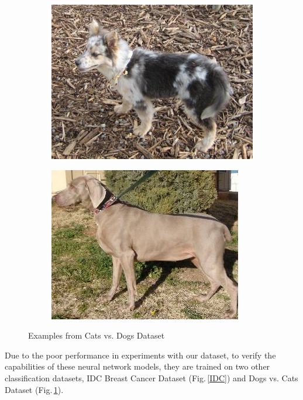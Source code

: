 \begin{figure}[h]
\begin{subfigure}[b]{.2\linewidth}
\end{subfigure}
\begin{subfigure}[b]{.2\linewidth}
\includegraphics[width=\linewidth]{Figs/dog4133.jpg}
\end{subfigure}
\begin{subfigure}[b]{.2\linewidth}
\includegraphics[width=\linewidth]{Figs/dog1178.jpg}
\end{subfigure}
\caption{Examples from Cats vs. Dogs Dataset}
\label{catdog}
\end{figure}

Due to the poor performance in experiments with our dataset, to verify the capabilities of these neural network models, they are trained on two other classification datasets, IDC Breast Cancer Dataset \citep{Janowczyk2016} (Fig.\,\ref{IDC}) and Dogs vs. Cats Dataset \citep{catdog}  (Fig.\,\ref{catdog}).


